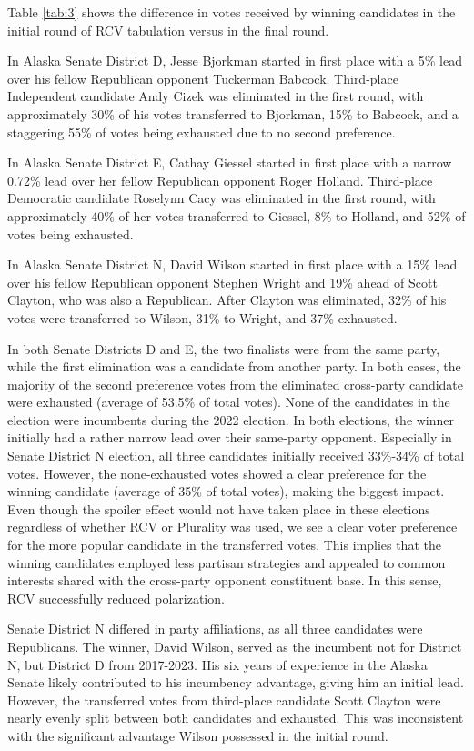 \documentclass[12pt, a4paper, twoside]{article}
\begin{document}
Table \ref{tab:3} shows the difference in votes received by winning candidates in the initial round of RCV tabulation versus in the final round. 

In Alaska Senate District D, Jesse Bjorkman started in first place with a 5\% lead over his fellow Republican opponent Tuckerman Babcock. Third-place Independent candidate Andy Cizek was eliminated in the first round, with approximately 30\% of his votes transferred to Bjorkman, 15\% to Babcock, and a staggering 55\% of votes being exhausted due to no second preference. 

In Alaska Senate District E, Cathay Giessel started in first place with a narrow 0.72\% lead over her fellow Republican opponent Roger Holland. Third-place Democratic candidate Roselynn Cacy was eliminated in the first round, with approximately 40\% of her votes transferred to Giessel, 8\% to Holland, and 52\% of votes being exhausted. 

In Alaska Senate District N, David Wilson started in first place with a 15\% lead over his fellow Republican opponent Stephen Wright and 19\% ahead of Scott Clayton, who was also a Republican. After Clayton was eliminated, 32\% of his votes were transferred to Wilson, 31\% to Wright, and 37\% exhausted. 

In both Senate Districts D and E, the two finalists were from the same party, while the first elimination was a candidate from another party. In both cases, the majority of the second preference votes from the eliminated cross-party candidate were exhausted (average of 53.5\% of total votes). None of the candidates in the election were incumbents during the 2022 election. In both elections, the winner initially had a rather narrow lead over their same-party opponent. Especially in Senate District N election, all three candidates initially received 33\%-34\% of total votes. However, the none-exhausted votes showed a clear preference for the winning candidate (average of 35\% of total votes), making the biggest impact. Even though the spoiler effect would not have taken place in these elections regardless of whether RCV or Plurality was used, we see a clear voter preference for the more popular candidate in the transferred votes. This implies that the winning candidates employed less partisan strategies and appealed to common interests shared with the cross-party opponent constituent base. In this sense, RCV successfully reduced polarization.

Senate District N differed in party affiliations, as all three candidates were Republicans. The winner, David Wilson, served as the incumbent not for District N, but District D from 2017-2023. His six years of experience in the Alaska Senate likely contributed to his incumbency advantage, giving him an initial lead. However, the transferred votes from third-place candidate Scott Clayton were nearly evenly split between both candidates and exhausted. This was inconsistent with the significant advantage Wilson possessed in the initial round. 
\end{document}
